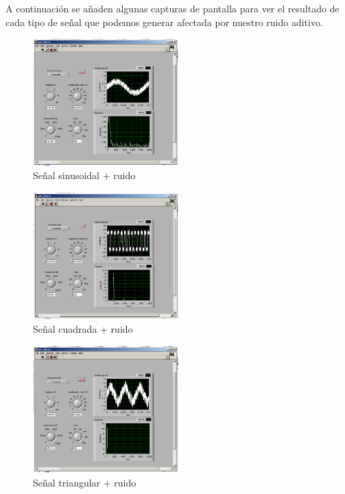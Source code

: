 \documentclass[10pt,a4paper,catalan]{article}
\begin{document}
A continuaci\'on se a\~naden algunas capturas de pantalla para ver el resultado de cada tipo de se\~nal que podemos generar afectada por nuestro ruido aditivo.

\begin{figure}[H]
 \centering
 \includegraphics[width=0.5\textwidth]{capturas/frontSinusSiRuido}
 \caption{Se\~nal sinusoidal + ruido}
 \label{fig:front-sinus-noise}
\end{figure}


\begin{figure}[H]
 \centering
 \includegraphics[width=0.5\textwidth]{capturas/frontCuadradaSiRuido}
 \caption{Se\~nal cuadrada + ruido}
 \label{fig:front-square-noise}
\end{figure}


\begin{figure}[H]
 \centering
 \includegraphics[width=0.5\textwidth]{capturas/frontTriSiRuido}
 \caption{Se\~nal triangular + ruido}
 \label{fig:front-tri-noise}
\end{figure}
\end{document}
